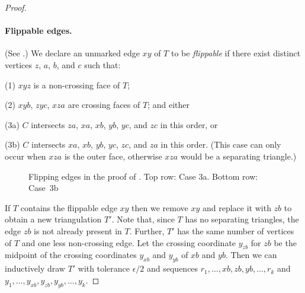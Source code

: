 \begin{proof}
	
\paragraph{Flippable edges.}
	(See .)
	We declare an unmarked edge $xy$ of $T$ to be \emph{flippable} if there
	exist distinct vertices $z$, $a$, $b$, and $c$ such that:
\begin{compactenum}[(11) ]
\item [(1)]
  $xyz$ is a non-crossing face of $T$;
\item [(2)]
  $xyb$, $zyc$, $xza$ are crossing faces of $T$;
  and either 
\item [(3a)] $C$
        intersects $za$, $xa$, $xb$, $yb$, $yc$, and $zc$ in this
        order, or
      \item [(3b)] $C$ intersects $xa$, $xb$, $yb$, $yc$, $zc$,
        and $za$ in this order. (This case can only occur when
        $xza$ is the outer face, otherwise $xza$ would be a separating
        triangle.)
        \end{compactenum}

        
	\begin{figure}
		\caption{Flipping edges in the proof of
			. Top row: Case 3a. Bottom row:
                        Case~3b}
	\end{figure}
	
	If $T$ contains the flippable edge $xy$ then we remove $xy$ and replace it with $zb$ to obtain a new triangulation $T'$. Note that, since $T$ has no separating triangles, the edge $zb$ is not already present in $T$. Further, $T'$ has the same number of vertices of $T$ and one less non-crossing edge. Let the crossing coordinate $y_{zb}$ for $zb$ be the midpoint of the crossing coordinates $y_{xb}$ and $y_{yb}$ of $xb$ and $yb$.  Then we can inductively draw $T'$ with tolerance $\epsilon/2$ and sequences $r_1,\dots,xb,zb,yb,\dots,r_k$ and $y_1,\dots,y_{xb},y_{zb},y_{yb},\dots,y_k$.
	

\end{proof}
